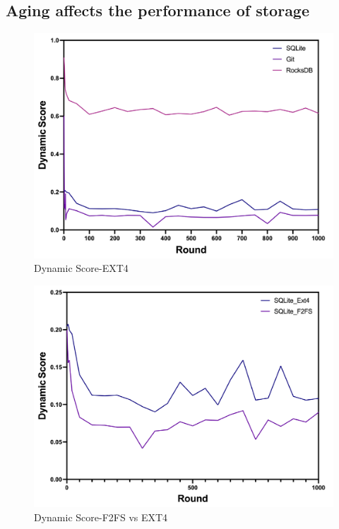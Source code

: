 





\subsection{Aging affects the performance of storage}

\begin{figure}[t]
    \centering
	\includegraphics[width=0.95\columnwidth]{graphs/ext4_dynamic}
	\caption{Dynamic Score-EXT4}
	\label{f:ext4_dynamic}
\end{figure}

\begin{figure}[t]
    \centering
	\includegraphics[width=0.95\columnwidth]{graphs/f2fs_vs_ext4_dynamic}
	\caption{Dynamic Score-F2FS vs EXT4}
	\label{f:f2fs_vs_ext4_dynamic}
\end{figure}

